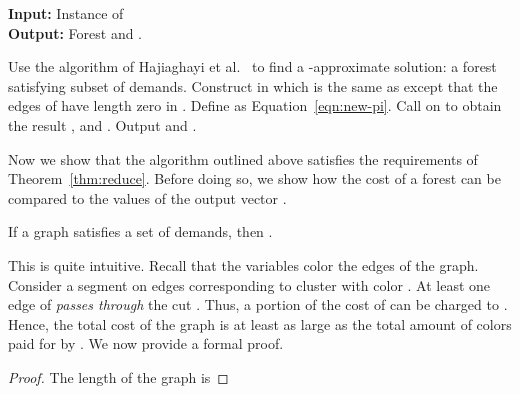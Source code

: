 \begin{algorithm}
\caption{\label{alg:prize-restrict}}
\textbf{Input:} Instance  of \\
\textbf{Output:} Forest  and .

\begin{algorithmic}[1]
 \STATE Use the algorithm of Hajiaghayi et al.~\cite{HKKN10} to find a -approximate 
solution:  a forest  satisfying subset  of demands.
\STATE Construct  in which  is the same as  except that
the edges of  have length zero in . \STATE Define  as Equation~\eqref{eqn:new-pi}.
\STATE Call  on  to obtain the result ,  and .
\STATE Output  and .
\end{algorithmic}
\end{algorithm}


Now we show that the algorithm  outlined above  satisfies the requirements
of Theorem~\ref{thm:reduce}.  Before doing so, we show how the cost of
a forest can be compared to the values of the output vector .
\begin{lemma}\label{lem:coloring}
If a graph  satisfies a set  of demands,
then .
\end{lemma}
This is quite intuitive.
Recall that the  variables color the edges of the graph.
Consider a segment on edges corresponding to cluster  with color .
At least one edge of  \emph{passes through} the cut .
Thus, a portion of the cost of  can be charged to .
Hence, the total cost of the graph  is at least as large as 
the total amount of colors paid for by .
We now provide a formal proof.
\begin{proof}
The length of the graph  is

\end{proof}





